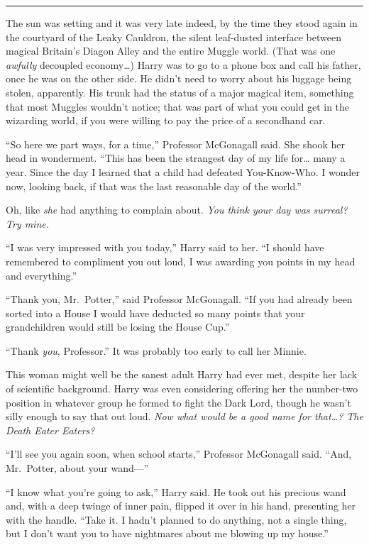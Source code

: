 \begin{center}\rule{3in}{0.4pt}\end{center}

The sun was setting and it was very late indeed, by the time they stood
again in the courtyard of the Leaky Cauldron, the silent leaf-dusted
interface between magical Britain's Diagon Alley and the entire Muggle
world. (That was one \emph{awfully} decoupled economy\ldots{}) Harry was
to go to a phone box and call his father, once he was on the other side.
He didn't need to worry about his luggage being stolen, apparently. His
trunk had the status of a major magical item, something that most
Muggles wouldn't notice; that was part of what you could get in the
wizarding world, if you were willing to pay the price of a secondhand
car.

``So here we part ways, for a time,'' Professor McGonagall said. She
shook her head in wonderment. ``This has been the strangest day of my
life for\ldots{} many a year. Since the day I learned that a child had
defeated You-Know-Who. I wonder now, looking back, if that was the last
reasonable day of the world.''

Oh, like \emph{she} had anything to complain about. \emph{You think your
day was surreal? Try mine.}

``I was very impressed with you today,'' Harry said to her. ``I should
have remembered to compliment you out loud, I was awarding you points in
my head and everything.''

``Thank you, Mr.~Potter,'' said Professor McGonagall. ``If you had
already been sorted into a House I would have deducted so many points
that your grandchildren would still be losing the House Cup.''

``Thank \emph{you}, Professor.'' It was probably too early to call her
Minnie.

This woman might well be the sanest adult Harry had ever met, despite
her lack of scientific background. Harry was even considering offering
her the number-two position in whatever group he formed to fight the
Dark Lord, though he wasn't silly enough to say that out loud. \emph{Now
what would be a good name for that\ldots{}? The Death Eater Eaters?}

``I'll see you again soon, when school starts,'' Professor McGonagall
said. ``And, Mr.~Potter, about your wand---''

``I know what you're going to ask,'' Harry said. He took out his
precious wand and, with a deep twinge of inner pain, flipped it over in
his hand, presenting her with the handle. ``Take it. I hadn't planned to
do anything, not a single thing, but I don't want you to have nightmares
about me blowing up my house.''

